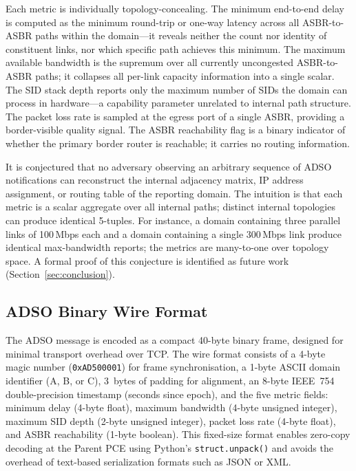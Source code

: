 \documentclass[conference]{IEEEtran}
\begin{document}
Each metric is individually topology-concealing. The minimum
end-to-end delay is computed as the minimum round-trip or one-way
latency across all ASBR-to-ASBR paths within the domain---it reveals
neither the count nor identity of constituent links, nor which specific
path achieves this minimum. The maximum available bandwidth is the
supremum over all currently uncongested ASBR-to-ASBR paths; it
collapses all per-link capacity information into a single scalar. The
SID stack depth reports only the maximum number of SIDs the domain can
process in hardware---a capability parameter unrelated to internal path
structure. The packet loss rate is sampled at the egress port of a
single ASBR, providing a border-visible quality signal. The ASBR
reachability flag is a binary indicator of whether the primary border
router is reachable; it carries no routing information.

It is conjectured that no adversary observing an arbitrary sequence of
ADSO notifications can reconstruct the internal adjacency matrix, IP
address assignment, or routing table of the reporting domain. The
intuition is that each metric is a scalar aggregate over all internal
paths; distinct internal topologies can produce identical 5-tuples.
For instance, a domain containing three parallel links of 100\,Mbps
each and a domain containing a single 300\,Mbps link produce identical
max-bandwidth reports; the metrics are many-to-one over topology space.
A formal proof of this conjecture is identified as future work
(Section~\ref{sec:conclusion}).

\subsection{ADSO Binary Wire Format}

The ADSO message is encoded as a compact 40-byte binary frame,
designed for minimal transport overhead over TCP. The wire format
consists of a 4-byte magic number (\texttt{0xAD500001}) for frame
synchronisation, a 1-byte ASCII domain identifier (A, B, or C),
3~bytes of padding for alignment, an 8-byte IEEE~754 double-precision
timestamp (seconds since epoch), and the five metric fields: minimum
delay (4-byte float), maximum bandwidth (4-byte unsigned integer),
maximum SID depth (2-byte unsigned integer), packet loss rate (4-byte
float), and ASBR reachability (1-byte boolean). This fixed-size format
enables zero-copy decoding at the Parent PCE using Python's
\texttt{struct.unpack()} and avoids the overhead of text-based
serialization formats such as JSON or XML.
\end{document}

